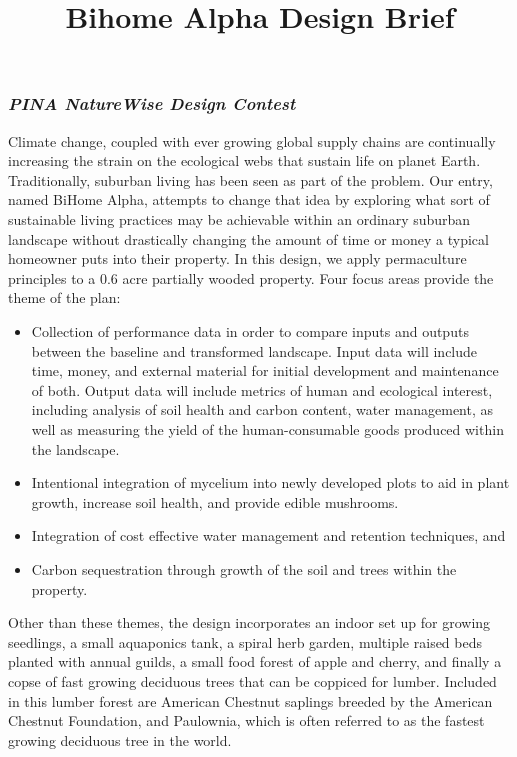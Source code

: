 \documentclass[a4paper]{article}
\title{\phantomsection%
  Bihome Alpha Design Brief%
  \label{bihome-alpha-design-brief}}
\author{}
\date{}
\providecommand*{\DUrubric}[1]{%
  \subsubsection*{\centering\textit{\textmd{#1}}}}
\begin{document}
\maketitle

\DUrubric{PINA NatureWise Design Contest}

Climate change, coupled with ever growing global supply chains are continually increasing the strain
on the ecological webs that sustain life on planet Earth. Traditionally, suburban living has been
seen as part of the problem. Our entry, named BiHome Alpha, attempts to change that idea by
exploring what sort of sustainable living practices may be achievable within an ordinary suburban
landscape without drastically changing the amount of time or money a typical homeowner puts into
their property. In this design, we apply permaculture principles to a 0.6 acre partially wooded
property. Four focus areas provide the theme of the plan:

\begin{itemize}
\item Collection of performance data in order to compare inputs and outputs between the baseline and
transformed landscape. Input data will include time, money, and external material for initial
development and maintenance of both. Output data will include metrics of human and ecological
interest, including analysis of soil health and carbon content, water management, as well as
measuring the yield of the human-consumable goods produced within the landscape.

\item Intentional integration of mycelium into newly developed plots to aid in plant growth, increase
soil health, and provide edible mushrooms.

\item Integration of cost effective water management and retention techniques, and

\item Carbon sequestration through growth of the soil and trees within the property.
\end{itemize}

Other than these themes, the design incorporates an indoor set up for growing seedlings, a small
aquaponics tank, a spiral herb garden, multiple raised beds planted with annual guilds, a small food
forest of apple and cherry, and finally a copse of fast growing deciduous trees that can be coppiced
for lumber. Included in this lumber forest are American Chestnut saplings breeded by the American
Chestnut Foundation, and Paulownia, which is often referred to as the fastest growing deciduous tree
in the world.
\end{document}
